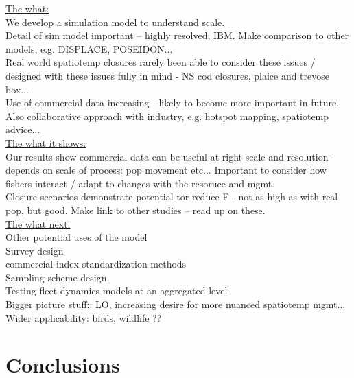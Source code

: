 \documentclass[review]{elsarticle}
\begin{document}
\underline{The what:}  \\

We develop a simulation model to understand scale.\\

Detail of sim model important -- highly resolved, IBM. Make comparison to other
models, e.g. DISPLACE, POSEIDON...\\

Real world spatiotemp closures rarely been able to consider these issues /
designed with these issues fully in mind - NS cod closures, plaice and trevose
box... \\

Use of commercial data increasing - likely to become more important in future.
Also collaborative approach with industry, e.g. hotspot mapping, spatiotemp
advice... \\

\underline{The what it shows:} \\

Our results show commercial data can be useful at right scale and resolution -
depends on scale of process: pop movement etc... Important to consider how
fishers interact / adapt to changes with the resoruce and mgmt. \\

Closure scenarios demonstrate potential tor reduce F - not as high as with real
pop, but good.  Make link to other studies -- read up on these. \\

\underline{The what next:} \\

Other potential uses of the model \\

Survey design \\

commercial index standardization methods \\

Sampling scheme design \\

Testing fleet dynamics models at an aggregated level \\

Bigger picture stuff::  LO, increasing desire for more nuanced spatiotemp
mgmt... Wider applicability: birds, wildlife ?? 

\section{Conclusions}
\end{document}
